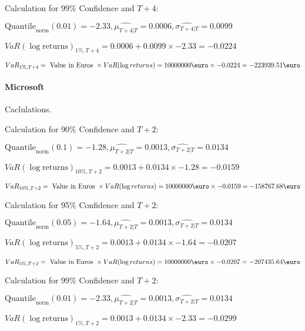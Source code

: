 Calculation for 99\% Confidence and $T+4$:

\indent\indent $\text{Quantile}_\text{norm}(0.01) = -2.33,\hat{\mu_{T+4|T}} = 0.0006, \hat{\sigma_{T+4|T}} = 0.0099$

\indent\indent $VaR(\log \text{returns})_{1\%, T + 4} = 0.0006 + 0.0099\times-2.33 = -0.0224$

\indent\indent $VaR_{1\%, T + 4} = \text{ Value in Euros } \times VaR(\log returns) = 10 000 000 \text{\euro} \times-0.0224 = -223939.51 \text{\euro}$\newline
\paragraph{Microsoft} Caclulations.\newline \indent 





Calculation for 90\% Confidence and $T+2$:

\indent\indent $\text{Quantile}_\text{norm}(0.1) = -1.28,\hat{\mu_{T+2|T}} = 0.0013, \hat{\sigma_{T+2|T}} = 0.0134$

\indent\indent $VaR(\log \text{returns})_{10\%, T + 2} = 0.0013 + 0.0134\times-1.28 = -0.0159$

\indent\indent $VaR_{10\%, T + 2} = \text{ Value in Euros } \times VaR(\log returns) = 10 000 000 \text{\euro} \times-0.0159 = -158767.68 \text{\euro}$\newline




Calculation for 95\% Confidence and $T+2$:

\indent\indent $\text{Quantile}_\text{norm}(0.05) = -1.64,\hat{\mu_{T+2|T}} = 0.0013, \hat{\sigma_{T+2|T}} = 0.0134$

\indent\indent $VaR(\log \text{returns})_{5\%, T + 2} = 0.0013 + 0.0134\times-1.64 = -0.0207$

\indent\indent $VaR_{5\%, T + 2} = \text{ Value in Euros } \times VaR(\log returns) = 10 000 000 \text{\euro} \times-0.0207 = -207435.64 \text{\euro}$\newline




Calculation for 99\% Confidence and $T+2$:

\indent\indent $\text{Quantile}_\text{norm}(0.01) = -2.33,\hat{\mu_{T+2|T}} = 0.0013, \hat{\sigma_{T+2|T}} = 0.0134$

\indent\indent $VaR(\log \text{returns})_{1\%, T + 2} = 0.0013 + 0.0134\times-2.33 = -0.0299$

